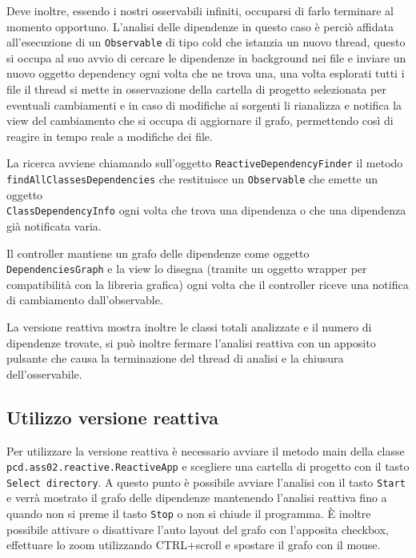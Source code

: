 \documentclass[11pt,notitlepage]{article}
\begin{document}
Deve inoltre, essendo i nostri osservabili infiniti, occuparsi di farlo terminare al momento opportuno. L'analisi delle dipendenze in questo caso è perciò affidata 
all'esecuzione di un \texttt{Observable} di tipo cold che istanzia un nuovo thread, questo si occupa al suo avvio di cercare le dipendenze in background nei file 
e inviare un nuovo oggetto dependency ogni volta che ne trova una, una volta esplorati tutti i file il thread si mette in osservazione della cartella di progetto
selezionata per eventuali cambiamenti e in caso di modifiche ai sorgenti li rianalizza e notifica la view del cambiamento che si occupa di aggiornare il grafo, 
permettendo così di reagire in tempo reale a modifiche dei file. 

La ricerca avviene chiamando sull'oggetto \texttt{ReactiveDependencyFinder} il metodo \\
\texttt{findAllClassesDependencies} che restituisce un \texttt{Observable} che emette un oggetto \\
\texttt{ClassDependencyInfo} ogni volta che trova una dipendenza o che una dipendenza già notificata varia.

Il controller mantiene un grafo delle dipendenze come oggetto \texttt{DependenciesGraph} e la view lo disegna (tramite un oggetto wrapper per compatibilità con la libreria grafica)
ogni volta che il controller riceve una notifica di cambiamento dall'observable.

La versione reattiva mostra inoltre le classi totali analizzate e il numero di dipendenze trovate, si può inoltre fermare l'analisi reattiva con un apposito pulsante che causa la
terminazione del thread di analisi e la chiusura dell'osservabile.

\subsection{Utilizzo versione reattiva}

Per utilizzare la versione reattiva è necessario avviare il metodo main della classe \\
\texttt{pcd.ass02.reactive.ReactiveApp} e scegliere una cartella di progetto con il tasto \texttt{Select directory}.
A questo punto è possibile avviare l'analisi con il tasto \texttt{Start} e verrà mostrato il grafo delle dipendenze mantenendo l'analisi reattiva fino a quando non si preme 
il tasto \texttt{Stop} o non si chiude il programma.
È inoltre possibile attivare o disattivare l'auto layout del grafo con l'apposita checkbox, effettuare lo zoom utilizzando CTRL+scroll e spostare il grafo con il mouse.
\end{document}
